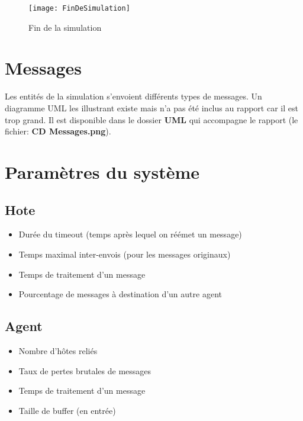 \documentclass[a4paper,11pt]{article}
\begin{document}
\begin{figure}[h!t]
  \centering
    \texttt{[image: FinDeSimulation]}
  \caption{Fin de la simulation}
  \label{fig:fin-de-simulation}
\end{figure}

















\section{Messages}
Les entités de la simulation s'envoient différents types de messages. Un diagramme UML les illustrant existe mais n'a pas été inclus au rapport car il est trop grand. Il est disponible dans le dossier \textbf{UML} qui accompagne le rapport (le fichier: \textbf{CD Messages.png}).








\section{Paramètres du système}

\subsection{Hote}
\begin{itemize}
 \item Durée du timeout (temps après lequel on réémet un message)
 \item Temps maximal inter-envois (pour les messages originaux)
 \item Temps de traitement d'un message
 \item Pourcentage de messages à destination d'un autre agent
\end{itemize}


\subsection{Agent}

\begin{itemize}
 \item Nombre d'hôtes reliés
 \item Taux de pertes brutales de messages
 \item Temps de traitement d'un message
 \item Taille de buffer (en entrée)
\end{itemize}
\end{document}
